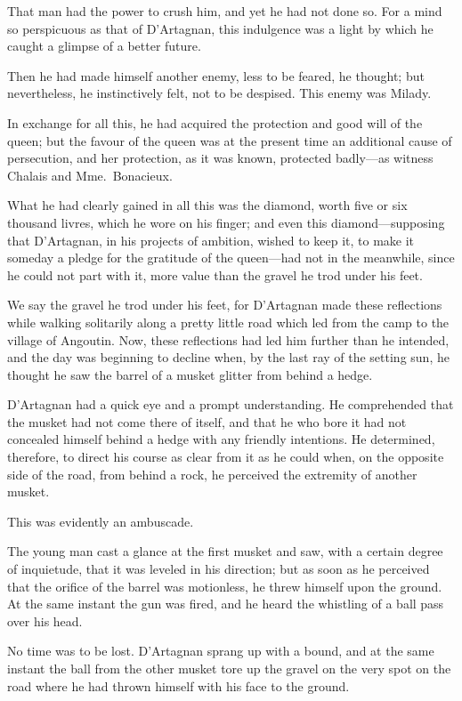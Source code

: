 That man had the power to crush him, and yet he had not done so. For a mind so perspicuous as that of D'Artagnan, this indulgence was a light by which he caught a glimpse of a better future. 

Then he had made himself another enemy, less to be feared, he thought; but nevertheless, he instinctively felt, not to be despised. This enemy was Milady. 

In exchange for all this, he had acquired the protection and good will of the queen; but the favour of the queen was at the present time an additional cause of persecution, and her protection, as it was known, protected badly—as witness Chalais and Mme.~Bonacieux. 

What he had clearly gained in all this was the diamond, worth five or six thousand livres, which he wore on his finger; and even this diamond—supposing that D'Artagnan, in his projects of ambition, wished to keep it, to make it someday a pledge for the gratitude of the queen—had not in the meanwhile, since he could not part with it, more value than the gravel he trod under his feet. 

We say the gravel he trod under his feet, for D'Artagnan made these reflections while walking solitarily along a pretty little road which led from the camp to the village of Angoutin. Now, these reflections had led him further than he intended, and the day was beginning to decline when, by the last ray of the setting sun, he thought he saw the barrel of a musket glitter from behind a hedge. 

D'Artagnan had a quick eye and a prompt understanding. He comprehended that the musket had not come there of itself, and that he who bore it had not concealed himself behind a hedge with any friendly intentions. He determined, therefore, to direct his course as clear from it as he could when, on the opposite side of the road, from behind a rock, he perceived the extremity of another musket. 

This was evidently an ambuscade. 

The young man cast a glance at the first musket and saw, with a certain degree of inquietude, that it was leveled in his direction; but as soon as he perceived that the orifice of the barrel was motionless, he threw himself upon the ground. At the same instant the gun was fired, and he heard the whistling of a ball pass over his head. 

No time was to be lost. D'Artagnan sprang up with a bound, and at the same instant the ball from the other musket tore up the gravel on the very spot on the road where he had thrown himself with his face to the ground. 

